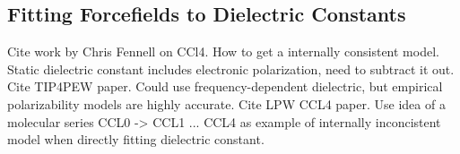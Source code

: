 \documentclass[aps,pre,twocolumn,superscriptaddress]{revtex4-1}
\begin{document}
\subsection{Fitting Forcefields to Dielectric Constants}

Cite work by Chris Fennell on CCl4.  How to get a internally consistent model.  Static dielectric constant includes electronic polarization, need to subtract it out.  Cite TIP4PEW paper.  Could use frequency-dependent dielectric, but empirical polarizability models are highly accurate.  Cite LPW CCL4 paper.  Use idea of a molecular series CCL0 -> CCL1 ... CCL4 as example of internally inconcistent model when directly fitting dielectric constant.
\end{document}
